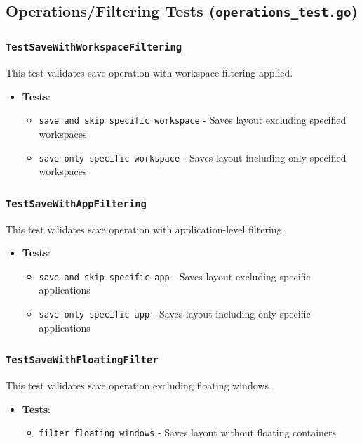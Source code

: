 \subsection{Operations/Filtering Tests (\texttt{operations\_test.go})}

\subsubsection*{\texttt{TestSaveWithWorkspaceFiltering}}
This test validates save operation with workspace filtering applied.
\begin{itemize}
    \item \textbf{Tests}:
    \begin{itemize}
        \item \texttt{save and skip specific workspace} - Saves layout excluding specified workspaces
        \item \texttt{save only specific workspace} - Saves layout including only specified workspaces
    \end{itemize}
\end{itemize}

\subsubsection*{\texttt{TestSaveWithAppFiltering}}
This test validates save operation with application-level filtering.
\begin{itemize}
    \item \textbf{Tests}:
    \begin{itemize}
        \item \texttt{save and skip specific app} - Saves layout excluding specific applications
        \item \texttt{save only specific app} - Saves layout including only specific applications
    \end{itemize}
\end{itemize}

\subsubsection*{\texttt{TestSaveWithFloatingFilter}}
This test validates save operation excluding floating windows.
\begin{itemize}
    \item \textbf{Tests}:
    \begin{itemize}
        \item \texttt{filter floating windows} - Saves layout without floating containers
    \end{itemize}
\end{itemize}

